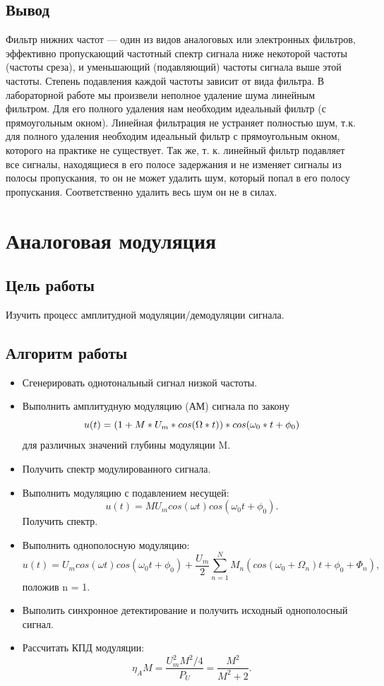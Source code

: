 \documentclass[10pt,a4paper]{article}
\begin{document}
\subsection{Вывод}
Фильтр нижних частот — один из видов аналоговых или электронных фильтров, эффективно пропускающий частотный спектр сигнала ниже некоторой частоты (частоты среза), и уменьшающий (подавляющий) частоты сигнала выше этой частоты. Степень подавления каждой частоты зависит от вида фильтра. В лабораторной работе мы произвели неполное удаление шума линейным фильтром. Для его полного удаления нам необходим идеальный фильтр (с прямоугольным окном). Линейная фильтрация не устраняет полностью шум, т.к. для полного удаления необходим идеальный фильтр с прямоугольным окном, которого на практике не существует. Так же, т. к. линейный фильтр подавляет все сигналы, находящиеся в его полосе задержания и не изменяет сигналы из полосы пропускания, то он не может удалить шум, который попал в его полосу 
пропускания. Соответственно удалить весь шум он не в силах. 
\section{Аналоговая модуляция}
\subsection{Цель работы}
Изучить процесс амплитудной модуляции/демодуляции сигнала.
\subsection{Алгоритм работы}
\begin{itemize}
\item Сгенерировать однотональный сигнал низкой частоты.
\item Выполнить амплитудную модуляцию (АМ) сигнала по закону 
\begin{displaymath}
u(t)=(1+M*U_{m}*cos(\Omega*t))*cos(\omega_{0}*t+\phi_{0})\newline
\end{displaymath}
  для различных значений глубины модуляции M.
\item Получить спектр модулированного сигнала.
\item Выполнить модуляцию с подавлением несущей: 
\begin{equation}
	u(t) = MU_m cos(\omega t)cos(\omega_0 t+\phi_0).
          \end{equation}
Получить спектр.
\item Выполнить однополосную модуляцию:
\begin{equation}
  u(t) = U_m cos(\omega t)cos(\omega_0 t+\phi_0)+\frac{U_m}{2}\sum_{n=1}^N M_n (cos(\omega_0 + \Omega_n )t + \phi_0 + \Phi_n ),
  \end{equation}
положив n = 1.
\item Выполить синхронное детектирование и получить исходный однополосный сигнал.
\item Рассчитать КПД модуляции:
\begin{equation}
					\eta_A M = \frac{U_m ^2 M^2 /4}{P_U} = \frac{M^2}{M^2 + 2}.
				\end{equation}
\end{itemize}
\end{document}
